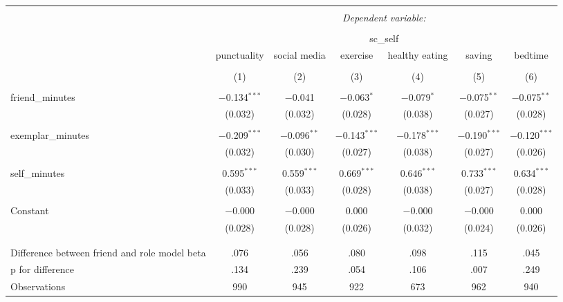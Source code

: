 
\begin{table}[!htbp] \centering 
  \caption{} 
  \label{} 
\begin{tabular}{@{\extracolsep{5pt}}lcccccc} 
\\[-1.8ex]\hline 
\hline \\[-1.8ex] 
 & \multicolumn{6}{c}{\textit{Dependent variable:}} \\ 
\cline{2-7} 
\\[-1.8ex] & \multicolumn{6}{c}{sc\_self} \\ 
 & punctuality & social media & exercise & healthy eating & saving & bedtime \\ 
\\[-1.8ex] & (1) & (2) & (3) & (4) & (5) & (6)\\ 
\hline \\[-1.8ex] 
 friend\_minutes & $-$0.134$^{***}$ & $-$0.041 & $-$0.063$^{*}$ & $-$0.079$^{*}$ & $-$0.075$^{**}$ & $-$0.075$^{**}$ \\ 
  & (0.032) & (0.032) & (0.028) & (0.038) & (0.027) & (0.028) \\ 
  & & & & & & \\ 
 exemplar\_minutes & $-$0.209$^{***}$ & $-$0.096$^{**}$ & $-$0.143$^{***}$ & $-$0.178$^{***}$ & $-$0.190$^{***}$ & $-$0.120$^{***}$ \\ 
  & (0.032) & (0.030) & (0.027) & (0.038) & (0.027) & (0.026) \\ 
  & & & & & & \\ 
 self\_minutes & 0.595$^{***}$ & 0.559$^{***}$ & 0.669$^{***}$ & 0.646$^{***}$ & 0.733$^{***}$ & 0.634$^{***}$ \\ 
  & (0.033) & (0.033) & (0.028) & (0.038) & (0.027) & (0.028) \\ 
  & & & & & & \\ 
 Constant & $-$0.000 & $-$0.000 & 0.000 & $-$0.000 & $-$0.000 & 0.000 \\ 
  & (0.028) & (0.028) & (0.026) & (0.032) & (0.024) & (0.026) \\ 
  & & & & & & \\ 
\hline \\[-1.8ex] 
Difference between friend and role model beta & .076 & .056 & .080 & .098 & .115 & .045 \\ 
p for difference & .134 & .239 & .054 & .106 & .007 & .249 \\ 
Observations & 990 & 945 & 922 & 673 & 962 & 940 \\ 

\end{tabular}
\end{table}
